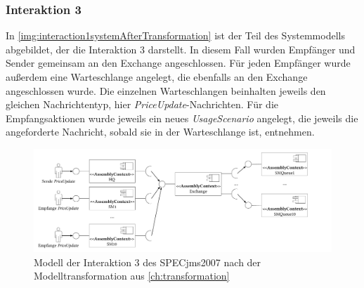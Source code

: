 \subsubsection{Interaktion 3}
In \autoref{img:interaction1systemAfterTransformation} ist der Teil des Systemmodells abgebildet, der die Interaktion 3 darstellt. In diesem Fall wurden Empfänger und Sender gemeinsam an den Exchange angeschlossen. Für jeden Empfänger wurde außerdem eine Warteschlange angelegt, die ebenfalls an den Exchange angeschlossen wurde. Die einzelnen Warteschlangen beinhalten jeweils den gleichen Nachrichtentyp, hier \emph{PriceUpdate}-Nachrichten. Für die Empfangsaktionen wurde jeweils ein neues \emph{UsageScenario} angelegt, die jeweils die angeforderte Nachricht, sobald sie in der Warteschlange ist, entnehmen.
\begin{figure}
\center
  \includegraphics[width=1.4\textwidth,angle=90]{images/evaluation/specjms/evaluationInteraktion3new.pdf}
  \caption{Modell der Interaktion 3 des SPECjms2007 nach der Modelltransformation aus \autoref{ch:transformation}}
  \label{img:interaction3systemAfterTransformation}
\end{figure}


